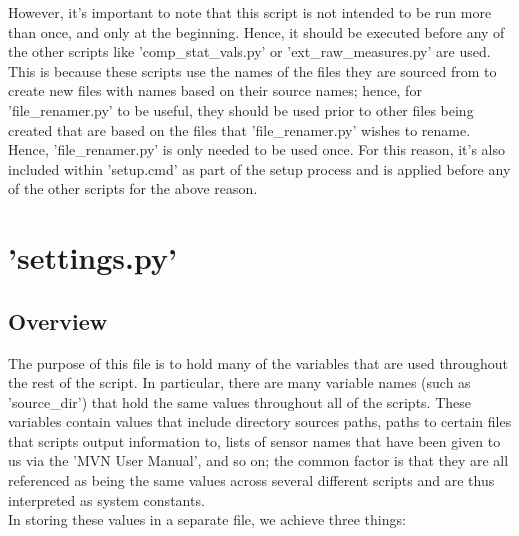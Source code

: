 \documentclass[12pt,twoside]{report}
\begin{document}
\quad However, it's important to note that this script is not intended to be run more than once, and only at the beginning. Hence, it should be executed before any of the other scripts like 'comp\_stat\_vals.py' or 'ext\_raw\_measures.py' are used. This is because these scripts use the names of the files they are sourced from to create new files with names based on their source names; hence, for 'file\_renamer.py' to be useful, they should be used prior to other files being created that are based on the files that 'file\_renamer.py' wishes to rename. Hence, 'file\_renamer.py' is only needed to be used once. For this reason, it's also included within 'setup.cmd' as part of the setup process and is applied before any of the other scripts for the above reason.


\section{'settings.py'}

\subsection{Overview}

\quad The purpose of this file is to hold many of the variables that are used throughout the rest of the script. In particular, there are many variable names (such as 'source\_dir') that hold the same values throughout all of the scripts. These variables contain values that include directory sources paths, paths to certain files that scripts output information to, lists of sensor names that have been given to us via the 'MVN User Manual', and so on; the common factor is that they are all referenced as being the same values across several different scripts and are thus interpreted as system constants.\\

\quad In storing these values in a separate file, we achieve three things:
\end{document}

